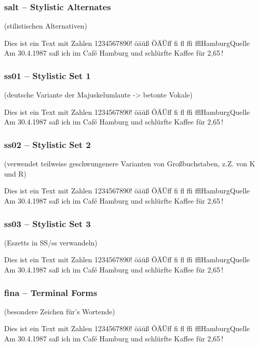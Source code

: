 \documentclass{fontdoku}
\def\TEXT{%
Dies ist ein Text mit Zahlen 1234567890!\newline%
öäüß ÖÄÜ\quad ff fi fl ffi ffl\quad Hamburg\quad Quelle\newline%
Am 30.4.1987 saß ich im \glqq{}Caf\'e Hamburg\grqq{} und schlürfte Kaffee für 2,65\,\libertineEuro!
}
\begin{document}
\subsubsection*{salt -- Stylistic Alternates} (stilistischen Alternativen)

\begin{lstsample}[hpos=l,lstsize=0.4,codesize=0.4,toprule,bottomrule]
\TEXT
\end{lstsample}

\subsubsection*{ss01 -- Stylistic Set 1} (deutsche Variante der Majuskelumlaute -> betonte Vokale)

\begin{lstsample}[hpos=l,lstsize=0.4,codesize=0.4,toprule,bottomrule]
\TEXT
\end{lstsample}


\subsubsection*{ss02 -- Stylistic Set 2} (verwendet teilweise geschwungenere Varianten von Großbuchstaben, z.Z. von K und R)

\begin{lstsample}[hpos=l,lstsize=0.4,codesize=0.4,toprule,bottomrule]
\TEXT
\end{lstsample}


\subsubsection*{ss03 -- Stylistic Set 3} (Eszetts in SS/ss verwandeln)

\begin{lstsample}[hpos=l,lstsize=0.4,codesize=0.4,toprule,bottomrule]
\TEXT
\end{lstsample}

\subsubsection*{fina -- Terminal Forms} (besondere Zeichen für's Wortende)

\begin{lstsample}[hpos=l,lstsize=0.4,codesize=0.4,toprule,bottomrule]
\TEXT
\end{lstsample}
\end{document}

